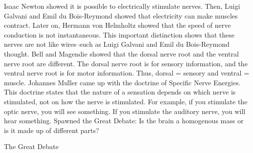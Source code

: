 Isaac Newton showed it is possible to electrically stimulate nerves.
Then, Luigi Galvani and Emil du Bois-Reymond showed that electricity can make muscles contract.
Later on, Hermann von Helmholtz showed that the speed of nerve conduction is not instantaneous.
    This important distinction shows that these nerves are not like wires--such as Luigi Galvani and Emil du Bois-Reymond thought.
Bell and Magendie showed that the dorsal nerve root and the ventral nerve root are different.
    The dorsal nerve root is for sensory information, and the ventral nerve root is for motor information.
    Thus, dorsal = sensory and ventral = muscle.
Johannes Mu\"ller came up with the doctrine of Specific Nerve Energies.
    This doctrine states that the nature of a sensation depends on which nerve is stimulated, not on how the nerve is stimulated.
    For example, if you stimulate the optic nerve, you will see something. If you stimulate the auditory nerve, you will hear something.
    Spawned the Great Debate: Is the brain a homogenous mass or is it made up of different parts?

The Great Debate


